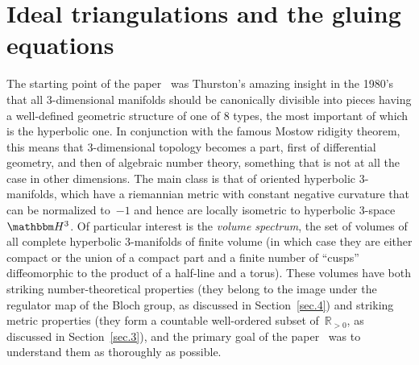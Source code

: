 \documentclass[12pt,reqno]{amsart}
\theoremstyle{definition}
\def\BH{\mathbbm H}
\def\R{\mathbb R}
\begin{document}

\section{Ideal triangulations and the gluing equations}
\label{sec.2}

The starting point of the paper~\cite{NZ} was Thurston's amazing insight in the 1980's
that all 
3-dimensional manifolds should be canonically divisible into pieces having a well-defined 
geometric structure of one of 8 types, the most important of which is the hyperbolic one. 
In conjunction with the famous Mostow ridigity theorem, this means that 3-dimensional
topology becomes a part, first of differential geometry, and then of algebraic number
theory, something that is not at all the case in other dimensions.  The main class is
that of oriented hyperbolic 3-manifolds, which have a riemannian metric with constant
negative curvature that can be normalized to~$-1$ and hence are locally isometric to
hyperbolic 3-space~$\BH^3$.  Of particular interest is the
{\it volume spectrum}, the set of volumes of all complete hyperbolic 3-manifolds of finite
volume (in which case they are either compact or the union of a compact part and a finite
number of ``cusps'' diffeomorphic to the product of a half-line and a torus).  These
volumes have both striking number-theoretical properties (they belong to the image under
the regulator map of the Bloch group, as discussed in Section~\ref{sec.4}) and striking
metric properties (they form a countable well-ordered subset of~$\R_{>0}$, as discussed in
Section~\ref{sec.3}), and the primary goal of the paper~\cite{NZ} was to understand them
as thoroughly as possible.
\end{document}
